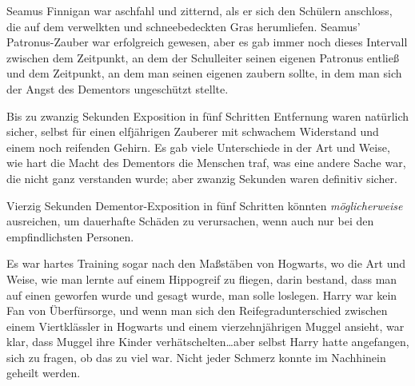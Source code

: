 \later

Seamus Finnigan war aschfahl und zitternd, als er sich den Schülern anschloss, die auf dem verwelkten und schneebedeckten Gras herumliefen. Seamus' Patronus-Zauber war erfolgreich gewesen, aber es gab immer noch dieses Intervall zwischen dem Zeitpunkt, an dem der Schulleiter seinen eigenen Patronus entließ und dem Zeitpunkt, an dem man seinen eigenen zaubern sollte, in dem man sich der Angst des Dementors ungeschützt stellte.

Bis zu zwanzig Sekunden Exposition in fünf Schritten Entfernung waren natürlich sicher, selbst für einen elfjährigen Zauberer mit schwachem Widerstand und einem noch reifenden Gehirn. Es gab viele Unterschiede in der Art und Weise, wie hart die Macht des Dementors die Menschen traf, was eine andere Sache war, die nicht ganz verstanden wurde; aber zwanzig Sekunden waren definitiv sicher.

Vierzig Sekunden Dementor-Exposition in fünf Schritten könnten \emph{möglicherweise} ausreichen, um dauerhafte Schäden zu verursachen, wenn auch nur bei den empfindlichsten Personen.

Es war hartes Training sogar nach den Maßstäben von Hogwarts, wo die Art und Weise, wie man lernte auf einem Hippogreif zu fliegen, darin bestand, dass man auf einen geworfen wurde und gesagt wurde, man solle loslegen. Harry war kein Fan von Überfürsorge, und wenn man sich den Reifegradunterschied zwischen einem Viertklässler in Hogwarts und einem vierzehnjährigen Muggel ansieht, war klar, dass Muggel ihre Kinder verhätschelten…aber selbst Harry hatte angefangen, sich zu fragen, ob das zu viel war. Nicht jeder Schmerz konnte im Nachhinein geheilt werden.

